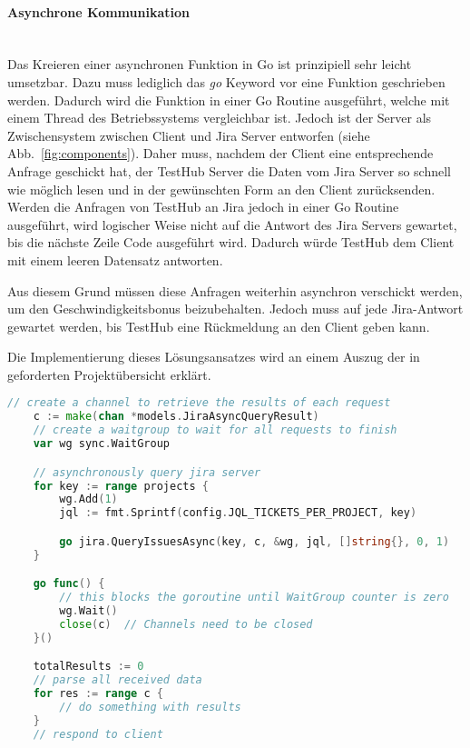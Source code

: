 \paragraph{Asynchrone Kommunikation}\hfill\\
Das Kreieren einer asynchronen Funktion in Go ist prinzipiell sehr leicht umsetzbar.
Dazu muss lediglich das \textit{go} Keyword vor eine Funktion geschrieben werden.
Dadurch wird die Funktion in einer Go Routine ausgeführt, welche mit einem Thread 
des Betriebssystems vergleichbar ist. 
Jedoch ist der Server als Zwischensystem zwischen Client und Jira Server entworfen 
(siehe Abb.~\ref{fig:components}). Daher muss, nachdem der Client 
eine entsprechende Anfrage geschickt hat, der TestHub Server die Daten vom \gls{Jira} 
Server so schnell wie möglich lesen und in der gewünschten Form an den Client zurücksenden.
Werden die Anfragen von TestHub an \gls{Jira} jedoch in einer Go Routine ausgeführt, wird logischer Weise nicht
auf die Antwort des \gls{Jira} Servers gewartet, bis die nächste Zeile Code ausgeführt wird.
Dadurch würde TestHub dem Client mit einem leeren Datensatz antworten.

\newpage

Aus diesem Grund müssen diese Anfragen weiterhin asynchron verschickt werden, um den Geschwindigkeitsbonus
beizubehalten. Jedoch muss auf jede Jira-Antwort gewartet werden, bis TestHub
eine Rückmeldung an den Client geben kann.

Die Implementierung dieses Lösungsansatzes wird an einem Auszug der in 
geforderten Projektübersicht erklärt.


\begin{lstlisting}[caption=Go Umsetzung von asynchronen HTTP Anfragen (\textit{backend/api/api\_jira.go}), language=Go, label={asyncgo}]
    // create a channel to retrieve the results of each request
    c := make(chan *models.JiraAsyncQueryResult)
    // create a waitgroup to wait for all requests to finish
    var wg sync.WaitGroup

    // asynchronously query jira server
    for key := range projects {
        wg.Add(1)
        jql := fmt.Sprintf(config.JQL_TICKETS_PER_PROJECT, key)

        go jira.QueryIssuesAsync(key, c, &wg, jql, []string{}, 0, 1)
    }

    go func() {
        // this blocks the goroutine until WaitGroup counter is zero
        wg.Wait() 
        close(c)  // Channels need to be closed
    }()

    totalResults := 0
    // parse all received data
    for res := range c {
        // do something with results
    }
    // respond to client
\end{lstlisting}

